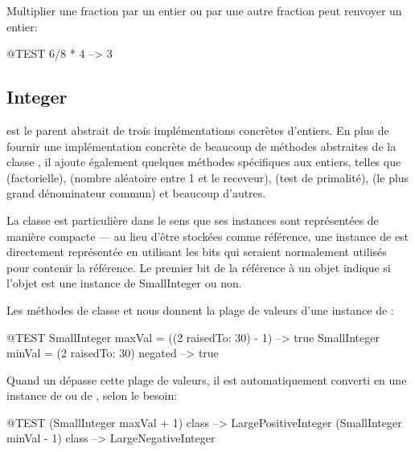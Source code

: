 \documentclass[a4paper,10pt,twoside]{book}
\begin{document}
Multiplier une fraction par un entier ou par une autre fraction peut renvoyer un entier:

\begin{code}{@TEST}
6/8 * 4 --> 3
\end{code}


\subsection{Integer}

 est le parent abstrait de trois implémentations
concrètes d'entiers. En plus de fournir une implémentation
concrète de beaucoup de méthodes abstraites de la classe
, il ajoute également quelques méthodes spécifiques
aux entiers, telles que 
(factorielle),
(nombre aléatoire entre 1 et le receveur),
(test de primalité), 
(le plus grand dénominateur commun)
et beaucoup d'autres.

La classe  est particulière dans le sens que ses instances sont représentées de manière compacte --- au lieu d'être stockées comme référence, une instance de  est directement représentée en utilisant les bits qui seraient normalement utilisés pour contenir la référence.  Le premier bit de la référence à un objet indique si l'objet est une instance de SmallInteger ou non.

Les méthodes de classe  et  nous donnent la plage de valeurs d'une instance de :

\begin{code}{@TEST}
SmallInteger maxVal = ((2 raisedTo: 30) - 1)      --> true
SmallInteger minVal = (2 raisedTo: 30) negated --> true
\end{code}

Quand un  dépasse cette plage de valeurs, il est automatiquement converti en une instance de  ou de , selon le besoin:

\begin{code}{@TEST}
(SmallInteger maxVal + 1) class --> LargePositiveInteger
(SmallInteger minVal - 1) class  --> LargeNegativeInteger
\end{code}
\end{document}
